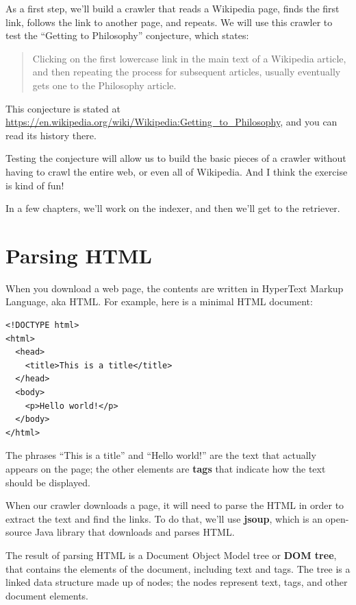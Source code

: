 \documentclass[12pt]{book}
\theoremstyle{exercise}
\begin{document}
As a first step, we'll build a crawler that reads a Wikipedia page,
finds the first link, follows the link to another page, and repeats. We
will use this crawler to test the ``Getting to Philosophy'' conjecture,
which states:

\begin{quote}
Clicking on the first lowercase link in the main text of a
Wikipedia article, and then repeating the process for subsequent
articles, usually eventually gets one to the Philosophy article.
\end{quote}

This conjecture is stated at
\url{https://en.wikipedia.org/wiki/Wikipedia:Getting_to_Philosophy}{},
and you can read its history there.

Testing the conjecture will allow us to build the basic pieces of a
crawler without having to crawl the entire web, or even all of
Wikipedia. And I think the exercise is kind of fun!

In a few chapters, we'll work on the indexer, and then we'll get to the
retriever.

\section{Parsing HTML}
\label{parsing-html}

When you download a web page, the contents are written in
HyperText Markup Language, aka HTML.
For example, here is a minimal HTML document:

\begin{verbatim}
<!DOCTYPE html>
<html>
  <head>
    <title>This is a title</title>
  </head>
  <body>
    <p>Hello world!</p>
  </body>
</html>
\end{verbatim}

The phrases ``This is a title'' and ``Hello world!'' are the text that
actually appears on the page; the other elements are \textbf{tags} that
indicate how the text should be displayed.

When our crawler downloads a page, it will need to parse the HTML in
order to extract the text and find the links. To do that, we'll use
\textbf{jsoup}, which is an open-source Java library that downloads and
parses HTML.

The result of parsing HTML is a Document Object Model tree or
\textbf{DOM tree}, that contains the elements of the document, including
text and tags. The tree is a linked data structure made up of nodes; the
nodes represent text, tags, and other document elements.
\end{document}
